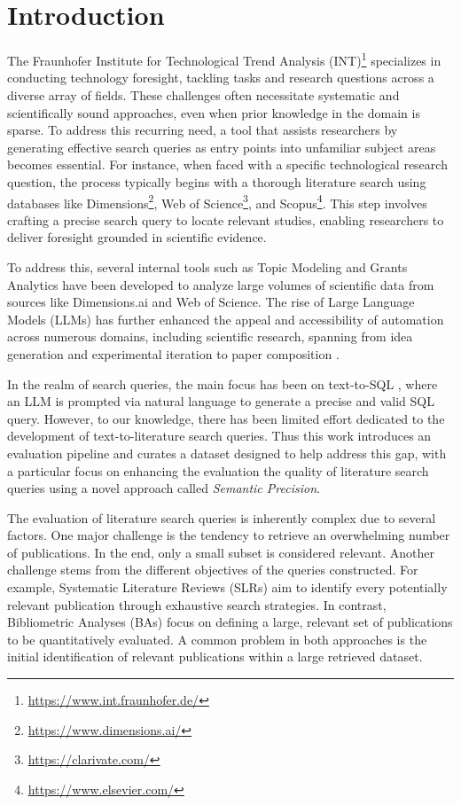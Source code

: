 \chapter{Introduction}\label{ch:intro}

The Fraunhofer Institute for Technological Trend Analysis (INT)\footnote{\url{https://www.int.fraunhofer.de/}} specializes in conducting technology foresight, tackling tasks and research questions across a diverse array of fields. These challenges often necessitate systematic and scientifically sound approaches, even when prior knowledge in the domain is sparse. To address this recurring need, a tool that assists researchers by generating effective search queries as entry points into unfamiliar subject areas becomes essential. For instance, when faced with a specific technological research question, the process typically begins with a thorough literature search using databases like Dimensions\footnote{\url{https://www.dimensions.ai/}}, Web of Science\footnote{\url{https://clarivate.com/}}, and Scopus\footnote{\url{https://www.elsevier.com/}}. This step involves crafting a precise search query to locate relevant studies, enabling researchers to deliver foresight grounded in scientific evidence.

To address this, several internal tools such as Topic Modeling and Grants Analytics have been developed to analyze large volumes of scientific data from sources like Dimensions.ai and Web of Science. The rise of Large Language Models (LLMs) has further enhanced the appeal and accessibility of automation across numerous domains, including scientific research, spanning from idea generation and experimental iteration to paper composition \autocite{lu2024aiscientistfullyautomated}.

In the realm of search queries, the main focus has been on text-to-SQL \autocite{dong2023c3}, where an LLM is prompted via natural language to generate a precise and valid SQL query. However, to our knowledge, there has been limited effort dedicated to the development of text-to-literature search queries. Thus this work introduces an evaluation pipeline and curates a dataset designed to help address this gap, with a particular focus on enhancing the evaluation the quality of literature search queries using a novel approach called \textit{Semantic Precision}.

The evaluation of literature search queries is inherently complex due to several factors. One major challenge is the tendency to retrieve an overwhelming number of publications. In the end, only a small subset is considered relevant. Another challenge stems from the different objectives of the queries constructed. For example, Systematic Literature Reviews (SLRs) aim to identify every potentially relevant publication through exhaustive search strategies. In contrast, Bibliometric Analyses (BAs) focus on defining a large, relevant set of publications to be quantitatively evaluated. A common problem in both approaches is the initial identification of relevant publications within a large retrieved dataset.


